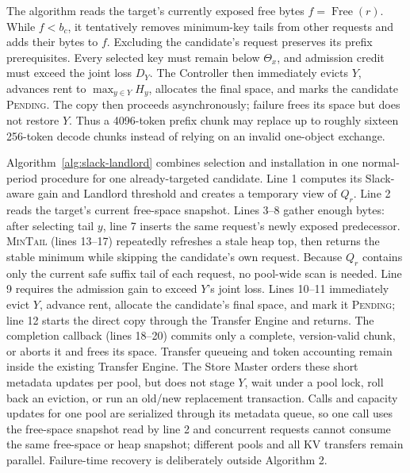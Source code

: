 The algorithm reads the target's currently exposed free bytes
$f=\operatorname{Free}(r)$.  While $f<b_c$, it tentatively removes minimum-key
tails from other requests and adds their bytes to $f$.  Excluding the
candidate's request preserves its prefix prerequisites.  Every selected key must remain below
$\Theta_x$, and admission credit must exceed the joint loss $D_Y$.  The Controller then immediately
evicts $Y$, advances rent to $\max_{y\in Y}H_y$, allocates the final space, and
marks the candidate \textsc{Pending}.  The copy then proceeds asynchronously;
failure frees its space but does not restore $Y$.
Thus a 4096-token prefix chunk may replace up to roughly sixteen 256-token
decode chunks instead of relying on an invalid one-object exchange.



Algorithm~\ref{alg:slack-landlord} combines selection and installation in one
normal-period procedure for one already-targeted candidate.  Line 1 computes
its Slack-aware gain and Landlord threshold and creates a temporary view of
$Q_r$.  Line 2 reads the target's current free-space snapshot.  Lines 3--8
gather enough bytes: after
selecting tail $y$, line 7 inserts the same request's newly exposed predecessor.
\textsc{MinTail} (lines 13--17)
repeatedly refreshes a stale heap top, then returns the stable minimum while
skipping the candidate's own request.  Because $Q_r$ contains only the current
safe suffix tail of each request, no pool-wide scan is needed.  Line 9 requires
the admission gain to exceed $Y$'s joint loss.  Lines 10--11 immediately evict
$Y$, advance rent, allocate the candidate's final space, and mark it
\textsc{Pending}; line 12 starts the direct
copy through the Transfer Engine and returns.  The completion callback
(lines 18--20) commits only a complete, version-valid chunk, or aborts it and
frees its space.  Transfer queueing and token accounting remain inside the
existing Transfer Engine.  The Store Master orders
these short metadata updates per pool, but does not stage $Y$, wait under a
pool lock, roll back an eviction, or run an old/new replacement transaction.
Calls and capacity updates for one pool are serialized through its metadata
queue, so one call uses the free-space snapshot read by line 2 and
concurrent requests cannot consume the same free-space or heap snapshot; different pools
and all KV transfers remain parallel.
Failure-time recovery is deliberately outside Algorithm 2.

